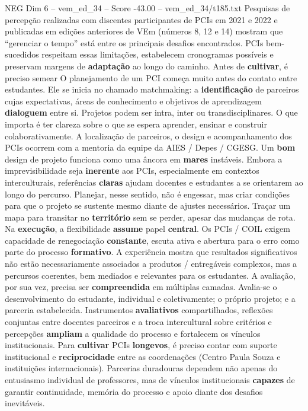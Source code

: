\begin{textsample}{NEG Dim 6 – vem\_ed\_34 – Score -43.00 – vem\_ed\_34/t185.txt}
Pesquisas de percepção realizadas com discentes participantes de PCIs em 2021 e 2022 e publicadas em edições anteriores de VEm (números 8, 12 e 14) mostram que “gerenciar o tempo” está entre os principais desafios encontrados.
PCIs bem-sucedidos respeitam essas limitações, estabelecem cronogramas possíveis e preservam margens de \textbf{adaptação} ao longo do caminho.
Antes de \textbf{cultivar}, é preciso semear O planejamento de um PCI começa muito antes do contato entre estudantes.
Ele se inicia no chamado matchmaking: a \textbf{identificação} de parceiros cujas expectativas, áreas de conhecimento e objetivos de aprendizagem \textbf{dialoguem} entre si.
Projetos podem ser intra, inter ou transdisciplinares.
O que importa é ter clareza sobre o que se espera aprender, ensinar e construir colaborativamente.
A localização de parceiros, o design e acompanhamento dos PCIs ocorrem com a mentoria da equipe da AIES / Depes / CGESG.
Um \textbf{bom} design de projeto funciona como uma âncora em \textbf{mares} instáveis.
Embora a imprevisibilidade seja \textbf{inerente} aos PCIs, especialmente em contextos interculturais, referências \textbf{claras} ajudam docentes e estudantes a se orientarem ao longo do percurso.
Planejar, nesse sentido, não é engessar, mas criar condições para que o projeto se sustente mesmo diante de ajustes necessários.
Traçar um mapa para transitar no \textbf{território} sem se perder, apesar das mudanças de rota.
Na \textbf{execução}, a flexibilidade \textbf{assume} papel \textbf{central}.
Os PCIs / COIL exigem capacidade de renegociação \textbf{constante}, escuta ativa e abertura para o erro como parte do processo \textbf{formativo}.
A experiência mostra que resultados significativos não estão necessariamente associados a produtos / entregáveis complexos, mas a percursos coerentes, bem mediados e relevantes para os estudantes.
A avaliação, por sua vez, precisa ser \textbf{compreendida} em múltiplas camadas.
Avalia-se o desenvolvimento do estudante, individual e coletivamente; o próprio projeto; e a parceria estabelecida.
Instrumentos \textbf{avaliativos} compartilhados, reflexões conjuntas entre docentes parceiros e a troca intercultural sobre critérios e percepções \textbf{ampliam} a qualidade do processo e fortalecem os vínculos institucionais.
Para \textbf{cultivar} PCIs \textbf{longevos}, é preciso contar com suporte institucional e \textbf{reciprocidade} entre as coordenações (Centro Paula Souza e instituições internacionais).
Parcerias duradouras dependem não apenas do entusiasmo individual de professores, mas de vínculos institucionais \textbf{capazes} de garantir continuidade, memória do processo e apoio diante dos desafios inevitáveis.

\end{textsample}
